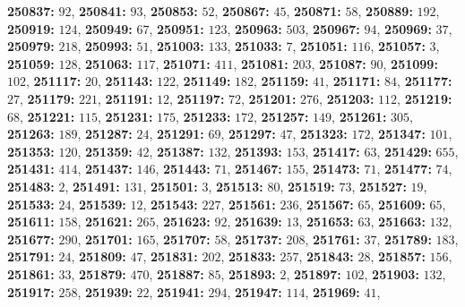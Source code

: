 \textsf{\bfseries 250837:} $92$, \textsf{\bfseries 250841:} $93$, \textsf{\bfseries 250853:} $52$, \textsf{\bfseries 250867:} $45$, \textsf{\bfseries 250871:} $58$, \textsf{\bfseries 250889:} $192$, \textsf{\bfseries 250919:} $124$, \textsf{\bfseries 250949:} $67$, \textsf{\bfseries 250951:} $123$, \textsf{\bfseries 250963:} $503$, \textsf{\bfseries 250967:} $94$, \textsf{\bfseries 250969:} $37$, \textsf{\bfseries 250979:} $218$, \textsf{\bfseries 250993:} $51$, \textsf{\bfseries 251003:} $133$, \textsf{\bfseries 251033:} $7$, \textsf{\bfseries 251051:} $116$, \textsf{\bfseries 251057:} $3$, \textsf{\bfseries 251059:} $128$, \textsf{\bfseries 251063:} $117$, \textsf{\bfseries 251071:} $411$, \textsf{\bfseries 251081:} $203$, \textsf{\bfseries 251087:} $90$, \textsf{\bfseries 251099:} $102$, \textsf{\bfseries 251117:} $20$, \textsf{\bfseries 251143:} $122$, \textsf{\bfseries 251149:} $182$, \textsf{\bfseries 251159:} $41$, \textsf{\bfseries 251171:} $84$, \textsf{\bfseries 251177:} $27$, \textsf{\bfseries 251179:} $221$, \textsf{\bfseries 251191:} $12$, \textsf{\bfseries 251197:} $72$, \textsf{\bfseries 251201:} $276$, \textsf{\bfseries 251203:} $112$, \textsf{\bfseries 251219:} $68$, \textsf{\bfseries 251221:} $115$, \textsf{\bfseries 251231:} $175$, \textsf{\bfseries 251233:} $172$, \textsf{\bfseries 251257:} $149$, \textsf{\bfseries 251261:} $305$, \textsf{\bfseries 251263:} $189$, \textsf{\bfseries 251287:} $24$, \textsf{\bfseries 251291:} $69$, \textsf{\bfseries 251297:} $47$, \textsf{\bfseries 251323:} $172$, \textsf{\bfseries 251347:} $101$, \textsf{\bfseries 251353:} $120$, \textsf{\bfseries 251359:} $42$, \textsf{\bfseries 251387:} $132$, \textsf{\bfseries 251393:} $153$, \textsf{\bfseries 251417:} $63$, \textsf{\bfseries 251429:} $655$, \textsf{\bfseries 251431:} $414$, \textsf{\bfseries 251437:} $146$, \textsf{\bfseries 251443:} $71$, \textsf{\bfseries 251467:} $155$, \textsf{\bfseries 251473:} $71$, \textsf{\bfseries 251477:} $74$, \textsf{\bfseries 251483:} $2$, \textsf{\bfseries 251491:} $131$, \textsf{\bfseries 251501:} $3$, \textsf{\bfseries 251513:} $80$, \textsf{\bfseries 251519:} $73$, \textsf{\bfseries 251527:} $19$, \textsf{\bfseries 251533:} $24$, \textsf{\bfseries 251539:} $12$, \textsf{\bfseries 251543:} $227$, \textsf{\bfseries 251561:} $236$, \textsf{\bfseries 251567:} $65$, \textsf{\bfseries 251609:} $65$, \textsf{\bfseries 251611:} $158$, \textsf{\bfseries 251621:} $265$, \textsf{\bfseries 251623:} $92$, \textsf{\bfseries 251639:} $13$, \textsf{\bfseries 251653:} $63$, \textsf{\bfseries 251663:} $132$, \textsf{\bfseries 251677:} $290$, \textsf{\bfseries 251701:} $165$, \textsf{\bfseries 251707:} $58$, \textsf{\bfseries 251737:} $208$, \textsf{\bfseries 251761:} $37$, \textsf{\bfseries 251789:} $183$, \textsf{\bfseries 251791:} $24$, \textsf{\bfseries 251809:} $47$, \textsf{\bfseries 251831:} $202$, \textsf{\bfseries 251833:} $257$, \textsf{\bfseries 251843:} $28$, \textsf{\bfseries 251857:} $156$, \textsf{\bfseries 251861:} $33$, \textsf{\bfseries 251879:} $470$, \textsf{\bfseries 251887:} $85$, \textsf{\bfseries 251893:} $2$, \textsf{\bfseries 251897:} $102$, \textsf{\bfseries 251903:} $132$, \textsf{\bfseries 251917:} $258$, \textsf{\bfseries 251939:} $22$, \textsf{\bfseries 251941:} $294$, \textsf{\bfseries 251947:} $114$, \textsf{\bfseries 251969:} $41$, 
